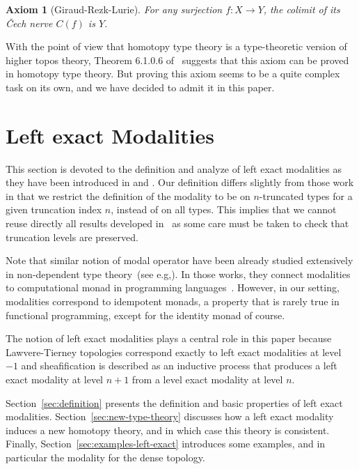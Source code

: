 \documentclass[conference]{IEEEtran}
\newtheorem{ax}[thm]{Axiom}
\newcommand{\eg}{e.g,\xspace}
\begin{document}
\begin{ax}[Giraud-Rezk-Lurie]
  For any surjection $f : X \to Y$, the colimit of its \v{C}ech nerve
  $C(f)$ is $Y$.
\end{ax}

With the point of view that homotopy type theory is a type-theoretic
version of higher topos theory, Theorem 6.1.0.6 of~\cite{lurie}
suggests that this axiom can be proved in homotopy type theory. 
%
But proving this axiom seems to be a quite complex task on its own,
and we have decided to admit it in this paper.



\section{Left exact Modalities}
\label{sec:lexmod}

This section is devoted to the definition and analyze of left exact
modalities as they have been introduced in \cite{hottbook} and
\cite{shulman-higher-modalities}. Our definition differs slightly from
those work in that we restrict the definition of the modality to be on
$n$-truncated types for a given truncation index $n$, instead of on
all types.
%
This implies that we cannot reuse directly all results developed
in~\cite{hottbook} as some care must be taken to check that truncation
levels are preserved.

Note that similar notion of modal operator have been already studied
extensively in non-dependent type
theory~(see \eg \cite{benton1998computational}). In those works, they connect
modalities to computational monad in programming
languages~\cite{moggi-monad}. However, in our setting, modalities
correspond to idempotent monads, a property that is rarely true 
in functional programming, except for the identity monad of course.

The notion of left exact modalities plays a central role in this paper
because Lawvere-Tierney topologies correspond exactly to left exact
modalities at level $-1$ and sheafification is described as an inductive
process that produces a left exact modality at level $n+1$ from a
level exact modality at level $n$. 

Section~\ref{sec:definition} presents the definition and basic
properties of left exact modalities. 
%
Section~\ref{sec:new-type-theory} discusses how a left exact modality
induces a new homotopy theory, and in which case this theory is
consistent.
%
Finally, Section~\ref{sec:examples-left-exact} introduces some
examples, and in particular the modality for the dense topology.
\end{document}
